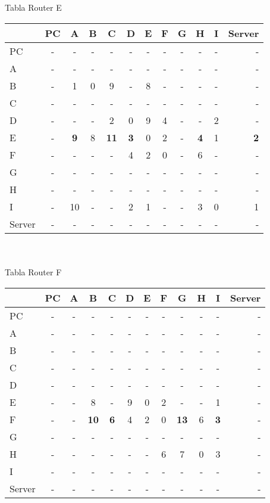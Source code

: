 \documentclass{article}
\begin{document}
\\
\\
Tabla Router E \\
\begin{tabular}{l*{10}{c}r}
              & PC & A & B & C & D & E & F & G & H & I & Server \\
\hline
PC             & - & - & - & - & - & - & - & - & - & - & -\\
A              & - & - & - & - & - & - & - & - & - & - & -\\
B              & - & 1 & 0 & 9 & - & 8 & - & - & - & - & -\\
C              & - & - & - & - & - & - & - & - & - & - & -\\
D              & - & - & - & 2 & 0 & 9 & 4 & - & - & 2 & -\\
E              & - &\bf{9}& 8 &\bf{11}&\bf{3}& 0 & 2 & - &\bf{4}& 1 &\bf{2}\\
F              & - & - & - & - & 4 & 2 & 0 & - & 6 & - & -\\
G              & - & - & - & - & - & - & - & - & - & - & -\\
H              & - & - & - & - & - & - & - & - & - & - & -\\
I              & - & 10 & - & - & 2 & 1 & - & - & 3 & 0 & 1\\
Server         & - & - & - & - & - & - & - & - & - & - & -\\

\end{tabular}
\\
\\
Tabla Router F \\
\begin{tabular}{l*{10}{c}r}
              & PC & A & B & C & D & E & F & G & H & I & Server \\
\hline
PC             & - & - & - & - & - & - & - & - & - & - & -\\
A              & - & - & - & - & - & - & - & - & - & - & -\\
B              & - & - & - & - & - & - & - & - & - & - & -\\
C              & - & - & - & - & - & - & - & - & - & - & -\\
D              & - & - & - & - & - & - & - & - & - & - & -\\
E              & - & - & 8 & - & 9 & 0 & 2 & - & - & 1 & -\\
F              & - & - &\bf{10}&\bf{6}& 4 & 2 & 0 &\bf{13}& 6 &\bf{3}& -\\
G              & - & - & - & - & - & - & - & - & - & - & -\\
H              & - & - & - & - & - & - & 6 & 7 & 0 & 3 & -\\
I              & - & - & - & - & - & - & - & - & - & - & -\\
Server         & - & - & - & - & - & - & - & - & - & - & -\\

\end{tabular}
\end{document}
